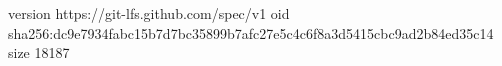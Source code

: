 version https://git-lfs.github.com/spec/v1
oid sha256:dc9e7934fabc15b7d7bc35899b7afc27e5c4c6f8a3d5415cbc9ad2b84ed35c14
size 18187
